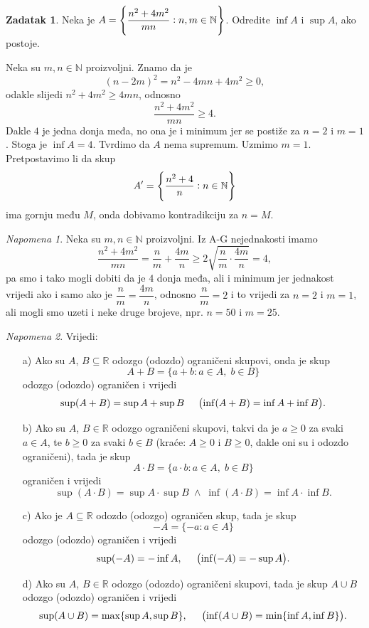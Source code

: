 \documentclass{book}
\let\originalleft\left
\let\originalright\right
\renewcommand{\left}{\mathopen{}\mathclose\bgroup\originalleft}
\renewcommand{\right}{\aftergroup\egroup\originalright}
\renewenvironment{proof}{%
    \vspace{-\parskip}\begin{oldproof}%
    }{%
    \end{oldproof}%
}
\theoremstyle{definition}
\theoremstyle{definition}
\newtheorem{exercise}{Zadatak}
\theoremstyle{remark}
\newtheorem{remark}{Napomena}
\begin{document}
\begin{exercise}
Neka je $A=\left\{\dfrac{n^2+4m^2}{mn} : n, m\in \mathbb{N}\right\}$. Odredite $\inf{A}$ i $\sup{A}$, ako postoje.
\end{exercise}
\begin{proof}[Rješenje]
Neka su $m, n\in \mathbb{N}$ proizvoljni. Znamo da je $$(n-2m)^2=n^2-4mn+4m^2\geq 0,$$
odakle slijedi $n^2+4m^2\geq 4mn$, odnosno $$\dfrac{n^2+4m^2}{mn}\geq 4.$$ Dakle $4$ je jedna donja međa, no ona je i minimum jer se postiže za $n=2$ i $m=1$. Stoga je $\inf{A}=4$. Tvrdimo da $A$ nema supremum. Uzmimo $m=1$. Pretpostavimo li da skup $$A'=\left\{\dfrac{n^2+4}{n} : n\in \mathbb{N}\right\}$$ ima gornju među $M$, onda dobivamo kontradikciju za $n=M$.
\end{proof}
\begin{remark}
Neka su $m, n\in \mathbb{N}$ proizvoljni. Iz A-G nejednakosti imamo
$$\dfrac{n^2+4m^2}{mn}=\dfrac{n}{m}+\dfrac{4m}{n}\geq 2\sqrt{\dfrac{n}{m}\cdot \dfrac{4m}{n}}=4,$$
pa smo i tako mogli dobiti da je $4$ donja međa, ali i minimum jer jednakost vrijedi ako i samo ako je $\dfrac{n}{m}=\dfrac{4m}{n}$, odnosno $\dfrac{n}{m}=2$ i to vrijedi za $n=2$ i $m=1$, ali mogli smo uzeti i neke druge brojeve, npr. $n=50$ i $m=25$.
\end{remark}

\begin{remark}
\label{prodsumsupinf}
Vrijedi:
\begin{itemize}
\item[a)] Ako su $A$, $B\subseteq \mathbb{R}$ odozgo (odozdo) ograničeni skupovi, onda je skup
$$A+B=\{a+b : a\in A,\; b\in B\}$$
odozgo (odozdo) ograničen i vrijedi
$$\sup(A+B)=\sup{A}+\sup{B}\hspace{0.5cm}\left(\inf(A+B)=\inf{A}+\inf{B}\right).$$
\item[b)] Ako su $A$, $B\in \mathbb{R}$ odozgo ograničeni skupovi, takvi da je $a\geq 0$ za svaki $a\in A$, te $b\geq 0$ za svaki $b\in B$ (kraće: $A\geq 0$ i $B\geq 0$, dakle oni su i odozdo ograničeni), tada je skup
$$A\cdot B=\{a\cdot b : a\in A,\; b\in B\}$$
ograničen i vrijedi
$$\sup(A\cdot B)=\sup{A}\cdot \sup{B} \; \wedge \; \inf(A\cdot B)=\inf{A}\cdot \inf{B}.$$
\item[c)] Ako je $A\subseteq \mathbb{R}$ odozdo (odozgo) ograničen skup, tada je skup
$$-A=\{-a : a\in A\}$$
odozgo (odozdo) ograničen i vrijedi
$$\sup(-A)=-\inf{A}, \hspace{0.5cm} \left(\inf(-A)=-\sup{A}\right).$$
\item[d)] Ako su $A$, $B\in \mathbb{R}$ odozgo (odozdo) ograničeni skupovi, tada je skup $A\cup B$ odozgo (odozdo) ograničen i vrijedi
$$\sup(A\cup B)=\max\{\sup{A},\sup{B}\},\hspace{0.5cm} \left(\inf(A\cup B)=\min\{\inf{A}, \inf{B}\}\right).$$
\end{itemize}
\end{remark}
\end{document}
